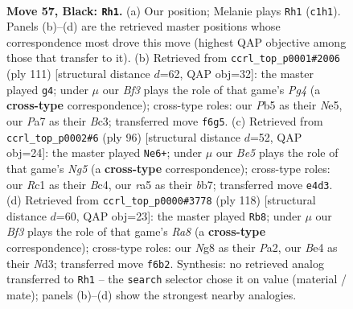 \documentclass[11pt]{article}
\begin{document}
\clearpage

\begin{figure}[p]\centering
\begin{subfigure}{0.46\textwidth}\centering
\resizebox{\linewidth}{!}{%
\newchessgame
\chessboard[
  setfen={6n1/p6k/P4b1p/Rp3p2/1P2bP2/1R4K1/8/1Nr5 b - - 5 57},
  showmover=false,
  pgfstyle=straightmove, color=movearrow, markmove={c1-h1}
]}
\caption{}
\end{subfigure}\hfill
\begin{subfigure}{0.46\textwidth}\centering
\resizebox{\linewidth}{!}{%
\newchessgame
\chessboard[
  setfen={8/8/r4k2/NR2nppp/Pp6/2b4P/4RPK1/8 b - - 3 56},
  showmover=false,
  pgfstyle=straightmove, color=movearrow, markmove={g5-g4}
]}
\caption{}
\end{subfigure}
\\[4pt]
\begin{subfigure}{0.46\textwidth}\centering
\resizebox{\linewidth}{!}{%
\newchessgame
\chessboard[
  setfen={8/1b2r1kp/p5p1/1n4N1/1PB2B1P/5P2/6P1/6K1 w - - 5 49},
  showmover=false,
  pgfstyle=straightmove, color=movearrow, markmove={g5-e6}
]}
\caption{}
\end{subfigure}\hfill
\begin{subfigure}{0.46\textwidth}\centering
\resizebox{\linewidth}{!}{%
\newchessgame
\chessboard[
  setfen={R7/8/1br2np1/pp1kB3/5P2/1P1N1K2/P7/8 w - - 4 60},
  showmover=false,
  pgfstyle=straightmove, color=movearrow, markmove={a8-b8}
]}
\caption{}
\end{subfigure}
\caption{\textbf{Move 57, Black: \texttt{Rh1}.} (a) Our position; Melanie plays \texttt{Rh1} (\texttt{c1h1}). Panels (b)--(d) are the retrieved master positions whose correspondence most drove this move (highest QAP objective among those that transfer to it). (b) Retrieved from \texttt{ccrl\_top\_p0001\#2006} (ply 111) [structural distance $d$=62, QAP obj=32]: the master played \texttt{g4}; under $\mu$ our \emph{Bf3} plays the role of that game's \emph{Pg4} (a \textbf{cross-type} correspondence); cross-type roles: our \emph{P}b5 as their \emph{N}e5, our \emph{P}a7 as their \emph{B}c3; transferred move \texttt{f6g5}. (c) Retrieved from \texttt{ccrl\_top\_p0002\#6} (ply 96) [structural distance $d$=52, QAP obj=24]: the master played \texttt{Ne6+}; under $\mu$ our \emph{Be5} plays the role of that game's \emph{Ng5} (a \textbf{cross-type} correspondence); cross-type roles: our \emph{R}c1 as their \emph{B}c4, our \emph{r}a5 as their \emph{b}b7; transferred move \texttt{e4d3}. (d) Retrieved from \texttt{ccrl\_top\_p0000\#3778} (ply 118) [structural distance $d$=60, QAP obj=23]: the master played \texttt{Rb8}; under $\mu$ our \emph{Bf3} plays the role of that game's \emph{Ra8} (a \textbf{cross-type} correspondence); cross-type roles: our \emph{N}g8 as their \emph{P}a2, our \emph{B}e4 as their \emph{N}d3; transferred move \texttt{f6b2}. Synthesis: no retrieved analog transferred to \texttt{Rh1} -- the \texttt{search} selector chose it on value (material / mate); panels (b)--(d) show the strongest nearby analogies.}
\label{fig:thought-m113}
\end{figure}
\end{document}

